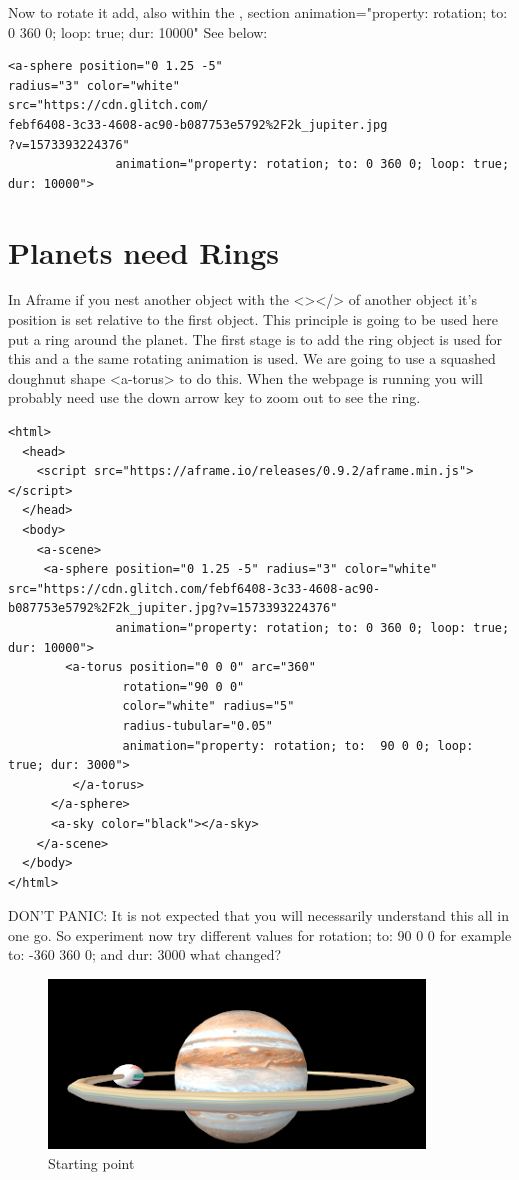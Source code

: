 Now to rotate it  add, also within the , section animation="property: rotation; to: 0 360 0; loop: true; dur: 10000" See below:

\begin{lstlisting}
<a-sphere position="0 1.25 -5" 
radius="3" color="white" 
src="https://cdn.glitch.com/
febf6408-3c33-4608-ac90-b087753e5792%2F2k_jupiter.jpg
?v=1573393224376"
               animation="property: rotation; to: 0 360 0; loop: true; dur: 10000">
\end{lstlisting}

\section{Planets need Rings}
In Aframe if you nest another object with the <></> of another object it's position is set relative to the first object. This principle is going to be used here put a ring around the planet. The first stage is to add the ring object is used for this and a the same rotating animation is used. We are going to use a squashed doughnut shape <a-torus> to do this. When the webpage is running you will probably need use the down arrow key to zoom out to see the ring.

\begin{lstlisting}
<html>
  <head>
    <script src="https://aframe.io/releases/0.9.2/aframe.min.js"></script>
  </head>
  <body>
    <a-scene>
     <a-sphere position="0 1.25 -5" radius="3" color="white" src="https://cdn.glitch.com/febf6408-3c33-4608-ac90-b087753e5792%2F2k_jupiter.jpg?v=1573393224376"
               animation="property: rotation; to: 0 360 0; loop: true; dur: 10000">
        <a-torus position="0 0 0" arc="360"
                rotation="90 0 0"
                color="white" radius="5"
                radius-tubular="0.05"
                animation="property: rotation; to:  90 0 0; loop: true; dur: 3000">
         </a-torus>
      </a-sphere>   
      <a-sky color="black"></a-sky>
    </a-scene>
  </body>
</html>
\end{lstlisting}

DON'T PANIC: It is not expected that you will necessarily understand this all in one go. So experiment now try different values for rotation; to:  90 0 0  for example to:  -360 360 0; and dur: 3000 what changed? 

\begin{figure}
    \centering
    \includegraphics[width=10cm]{chapters/chapter2/figures/Picture1.png}
    \caption{Starting point}
    \label{fig:Picture1}
\end{figure}


